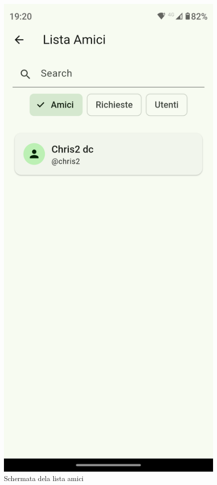\documentclass{article}
\begin{document}
\begin{figure}[H]
  \centering
  \includegraphics[width=0.6\linewidth]{friends-list-f.png}
  \caption{Schermata dela lista amici}
  \label{fig:sitemap}
\end{figure}
\end{document}
